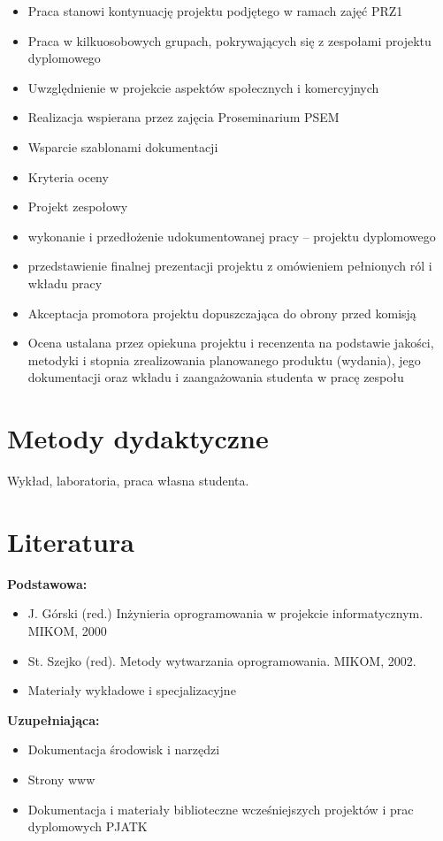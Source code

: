 \documentclass[12pt, a4paper]{article}
\begin{document}
\begin{itemize}
  \item Praca stanowi kontynuację projektu podjętego w ramach zajęć PRZ1
  \item Praca w kilkuosobowych grupach, pokrywających się z zespołami projektu dyplomowego
  \item Uwzględnienie w projekcie aspektów społecznych i komercyjnych
  \item Realizacja wspierana przez zajęcia Proseminarium PSEM
  \item Wsparcie szablonami dokumentacji
  \item Kryteria oceny
  \item Projekt zespołowy
  \item wykonanie i przedłożenie udokumentowanej pracy – projektu dyplomowego
  \item przedstawienie finalnej prezentacji projektu z omówieniem pełnionych ról i wkładu pracy
  \item Akceptacja promotora projektu dopuszczająca do obrony przed komisją
  \item Ocena ustalana przez opiekuna projektu i recenzenta na podstawie jakości, metodyki i stopnia zrealizowania planowanego produktu (wydania), jego dokumentacji oraz wkładu i zaangażowania studenta w pracę zespołu
\end{itemize}

\section{Metody dydaktyczne}

Wykład, laboratoria, praca własna studenta.

\section{Literatura}

\textbf{Podstawowa:}
\begin{itemize}
  \item J. Górski (red.) Inżynieria oprogramowania w projekcie informatycznym. MIKOM, 2000
  \item St. Szejko (red). Metody wytwarzania oprogramowania. MIKOM, 2002.
  \item Materiały wykładowe i specjalizacyjne
\end{itemize}

\textbf{Uzupełniająca:}
\begin{itemize}
  \item Dokumentacja środowisk i narzędzi
  \item Strony www
  \item Dokumentacja i materiały biblioteczne wcześniejszych projektów i prac dyplomowych PJATK
\end{itemize}
\end{document}
